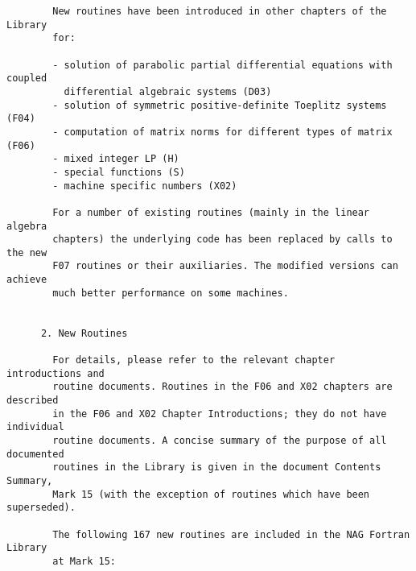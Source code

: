 \begin{small}
\begin{verbatim}
        New routines have been introduced in other chapters of the Library       
        for:                                                                     
                                                                                 
        - solution of parabolic partial differential equations with coupled      
          differential algebraic systems (D03)                                   
        - solution of symmetric positive-definite Toeplitz systems (F04)         
        - computation of matrix norms for different types of matrix (F06)        
        - mixed integer LP (H)                                                   
        - special functions (S)                                                  
        - machine specific numbers (X02)                                         
                                                                                 
        For a number of existing routines (mainly in the linear algebra          
        chapters) the underlying code has been replaced by calls to the new      
        F07 routines or their auxiliaries. The modified versions can achieve     
        much better performance on some machines.                                
                                                                                 
                                                                                 
      2. New Routines                                                            
                                                                                 
        For details, please refer to the relevant chapter introductions and      
        routine documents. Routines in the F06 and X02 chapters are described    
        in the F06 and X02 Chapter Introductions; they do not have individual    
        routine documents. A concise summary of the purpose of all documented    
        routines in the Library is given in the document Contents Summary,       
        Mark 15 (with the exception of routines which have been superseded).     
                                                                                 
        The following 167 new routines are included in the NAG Fortran Library   
        at Mark 15:                                                              
                                                                                 

\end{verbatim}
\end{small}
